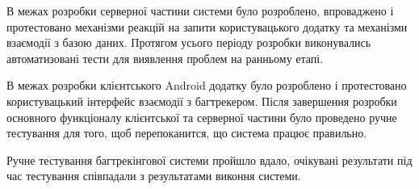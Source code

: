 \documentclass[../main.tex]{subfiles}
\begin{document}
	В межах розробки серверної частини системи було розроблено, впроваджено і протестовано механізми реакцій на запити користувацького додатку та механізми взаємодії з базою даних. Протягом усього періоду розробки виконувались автоматизовані тести для виявлення проблем на ранньому етапі.
	
	В межах розробки клієнтського Android додатку було розроблено і протестовано користувацький інтерфейс взаємодії з багтрекером. Після завершення розробки основного функціоналу клієнтської та серверної частини було проведено ручне тестування для того, щоб перепоканится, що система працює правильно.
	
	Ручне тестування багтрекінгової системи пройшло вдало, очікувані результати під час тестування співпадали з результатами виконня системи.
\end{document}
